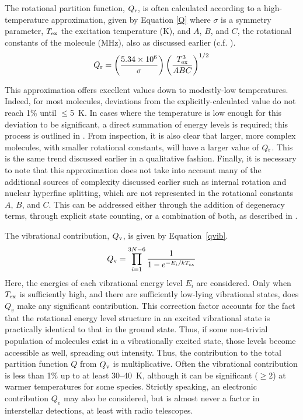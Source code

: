 \documentclass[twocolumn]{aastex631}
\begin{document}
The rotational partition function, $Q_{\rm{r}}$, is often calculated according to a high-temperature approximation, given by  Equation \ref{Q} where $\sigma$ is a symmetry parameter, $T_{\rm{ex}}$ the excitation temperature (K), and $A$, $B$, and $C$, the rotational constants of the molecule (MHz), also as discussed earlier (c.f. \citealt{Gordy:1984uy}). 
\begin{equation}
Q_{\rm{r}} = \left(\frac{5.34 \times 10^6}{\sigma}\right)\left(\frac{T_{\rm{ex}}^3}{ABC}\right)^{1/2}
\label{Q}
\end{equation}

This approximation offers excellent values down to modestly-low temperatures.  Indeed, for most molecules, deviations from the explicitly-calculated value do not reach 1\% until $\leq$5~K.  In cases where the temperature is low enough for this deviation to be significant, a direct summation of energy levels is required; this process is outlined in \citet{Gordy:1984uy}.   From inspection, it is also clear that larger, more complex molecules, with smaller rotational constants, will have a larger value of $Q_{\rm{r}}$.  This is the same trend discussed earlier in a qualitative fashion.  Finally, it is necessary to note that this approximation does not take into account many of the additional sources of complexity discussed earlier such as internal rotation and nuclear hyperfine splitting, which are not represented in the rotational constants $A$, $B$, and $C$.  This can be addressed either through the addition of degeneracy terms, through explicit state counting, or a combination of both, as described in \citet{Gordy:1984uy}.

The vibrational contribution, $Q_{\rm{v}}$, is given by Equation~\ref{qvib}.
\begin{equation}
Q_{\rm{v}}=\prod\limits_{\substack{i=1}}^{3N-6} \frac{1}{1-e^{-E_i/kT_{\rm{ex}}}}
\label{qvib}
\end{equation}
Here, the energies of each vibrational energy level $E_i$ are considered.  Only when $T_{\rm{ex}}$ is sufficiently high, and there are sufficiently low-lying vibrational states, does $Q_{v}$ make any significant contribution.  This correction factor accounts for the fact that the rotational energy level structure in an excited vibrational state is practically identical to that in the ground state.  Thus, if some non-trivial population of molecules exist in a vibrationally excited state, those levels become accessible as well, spreading out intensity.  Thus, the contribution to the total partition function $Q$ from $Q_{\rm{v}}$ is multiplicative.  Often the vibrational contribution is less than 1\% up to at least 30--40~K, although it can be significant ($\geq$2) at warmer temperatures for some species.  Strictly speaking, an electronic contribution $Q_e$ may also be considered, but is almost never a factor in interstellar detections, at least with radio telescopes.
\end{document}
